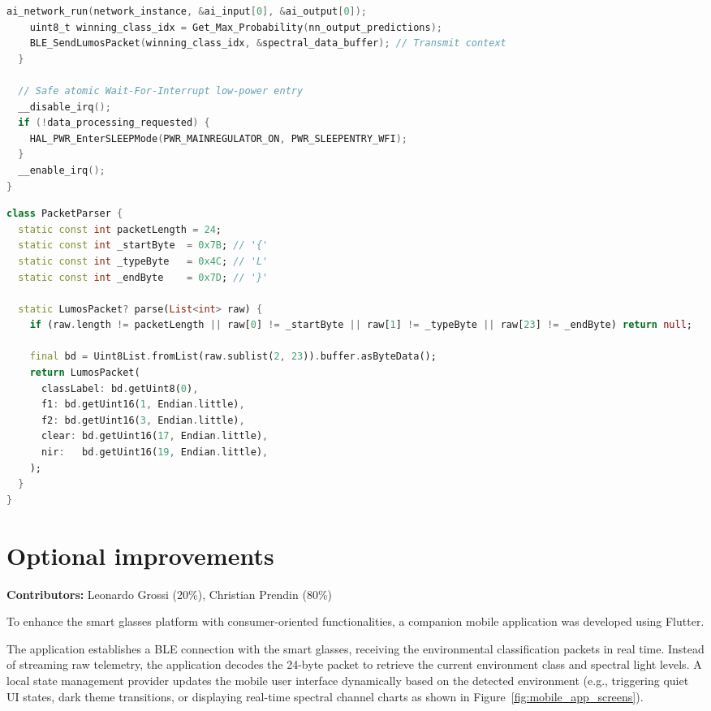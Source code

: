 \documentclass[10pt]{article}
\begin{document}
\begin{multicols}{2}
\begin{lstlisting}[language=C, caption=On-Chip TinyML Inference Loop Execution]
    ai_network_run(network_instance, &ai_input[0], &ai_output[0]);
    uint8_t winning_class_idx = Get_Max_Probability(nn_output_predictions);
    BLE_SendLumosPacket(winning_class_idx, &spectral_data_buffer); // Transmit context
  }

  // Safe atomic Wait-For-Interrupt low-power entry
  __disable_irq();
  if (!data_processing_requested) {
    HAL_PWR_EnterSLEEPMode(PWR_MAINREGULATOR_ON, PWR_SLEEPENTRY_WFI);
  }
  __enable_irq();
}
\end{lstlisting}

\begin{lstlisting}[language=Dart, caption=Flutter Dart Companion App BLE Packet Parser]
class PacketParser {
  static const int packetLength = 24;
  static const int _startByte  = 0x7B; // '{'
  static const int _typeByte   = 0x4C; // 'L'
  static const int _endByte    = 0x7D; // '}'

  static LumosPacket? parse(List<int> raw) {
    if (raw.length != packetLength || raw[0] != _startByte || raw[1] != _typeByte || raw[23] != _endByte) return null;

    final bd = Uint8List.fromList(raw.sublist(2, 23)).buffer.asByteData();
    return LumosPacket(
      classLabel: bd.getUint8(0),
      f1: bd.getUint16(1, Endian.little),
      f2: bd.getUint16(3, Endian.little),
      clear: bd.getUint16(17, Endian.little),
      nir:   bd.getUint16(19, Endian.little),
    );
  }
}
\end{lstlisting}

\section{Optional improvements}
\noindent\textbf{Contributors:} Leonardo Grossi (20\%), Christian Prendin (80\%)
\vspace{0.1cm}

To enhance the smart glasses platform with consumer-oriented functionalities, a companion mobile application was developed using Flutter. 

The application establishes a BLE connection with the smart glasses, receiving the environmental classification packets in real time. Instead of streaming raw telemetry, the application decodes the 24-byte packet to retrieve the current environment class and spectral light levels. A local state management provider updates the mobile user interface dynamically based on the detected environment (e.g., triggering quiet UI states, dark theme transitions, or displaying real-time spectral channel charts as shown in Figure~\ref{fig:mobile_app_screens}).


\end{multicols}
\end{document}
